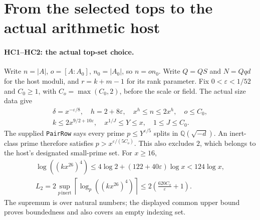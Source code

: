 \section{From the selected tops to the actual arithmetic host}
\label{sec:host-tops}


\paragraph{HC1--HC2: the actual top-set choice.}
Write $n=|A|$, $o=[A:A_0]$, $n_0=|A_0|$, so $n=on_0$.
Write $Q=QS$ and $N=Qqd$ for the host moduli, and
$r=k+m-1$ for its rank parameter.
Fix $0<\varepsilon<1/52$ and $C_0\ge1$, with
$C_o=\max(C_0,2)$, before the scale or field. The actual size data give
\[
 \begin{gathered}
 \delta=x^{-\varepsilon/8},\quad h=2+8\varepsilon,
 \quad x^h\le n\le2x^h,\quad o\le C_0,\\
 k\le2x^{9/2+10\varepsilon},\quad
 x^{1/J}\le Y\le x,\quad 1\le J\le C_0.
 \end{gathered}                                      \tag{HC.1}
\]
The supplied \texttt{PairRow} says every prime
$p\le Y^{\varepsilon/5}$ splits in $\mathbb Q(\sqrt{-d})$.
An inert-class prime therefore satisfies
$p>x^{\varepsilon/(5C_o)}$. This also excludes $2$, which belongs
to the host's designated small-prime set. For $x\ge16$,
\[
 \begin{gathered}
 \log((kx^{26})^4)
 \le4\log2+(122+40\varepsilon)\log x<124\log x,\\
 L_2=2\sup_{p\,\mathrm{inert}}
       \left\lceil\log_p((kx^{26})^4)\right\rceil
 \le2\left(\frac{620C_o}{\varepsilon}+1\right).
 \end{gathered}                                      \tag{HC.2}
\]
The supremum is over natural numbers; the displayed common upper
bound proves boundedness and also covers an empty indexing set.

